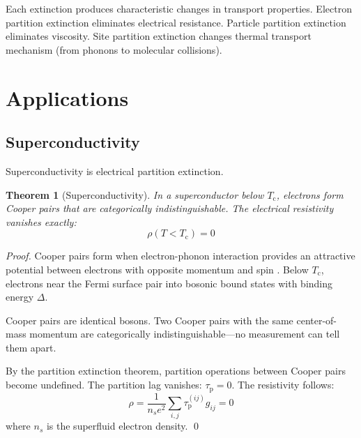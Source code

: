 \documentclass[twocolumn,10pt,aps,prd,superscriptaddress,nofootinbib]{revtex4-2}
\newtheorem{theorem}{Theorem}[section]
\theoremstyle{remark}
\newcommand{\tauP}{\tau_{\mathrm{p}}}
\newcommand{\Tcrit}{T_{\mathrm{c}}}
\newcommand{\Gij}{g_{ij}}
\begin{document}
Each extinction produces characteristic changes in transport properties. Electron partition extinction eliminates electrical resistance. Particle partition extinction eliminates viscosity. Site partition extinction changes thermal transport mechanism (from phonons to molecular collisions).


\section{Applications}
\label{sec:applications}

\subsection{Superconductivity}

Superconductivity is electrical partition extinction.

\begin{theorem}[Superconductivity]
\label{thm:superconductivity}
In a superconductor below $\Tcrit$, electrons form Cooper pairs that are categorically indistinguishable. The electrical resistivity vanishes exactly:
\begin{equation}
\rho(T < \Tcrit) = 0
\label{eq:superconductivity}
\end{equation}
\end{theorem}

\begin{proof}
Cooper pairs form when electron-phonon interaction provides an attractive potential between electrons with opposite momentum and spin \cite{cooper1956}. Below $\Tcrit$, electrons near the Fermi surface pair into bosonic bound states with binding energy $\Delta$.

Cooper pairs are identical bosons. Two Cooper pairs with the same center-of-mass momentum are categorically indistinguishable---no measurement can tell them apart.

By the partition extinction theorem, partition operations between Cooper pairs become undefined. The partition lag vanishes: $\tauP = 0$. The resistivity follows:
\begin{equation}
\rho = \frac{1}{n_s e^2} \sum_{i,j} \tauP^{(ij)} \Gij = 0
\end{equation}
where $n_s$ is the superfluid electron density. \qed
\end{proof}
\end{document}

